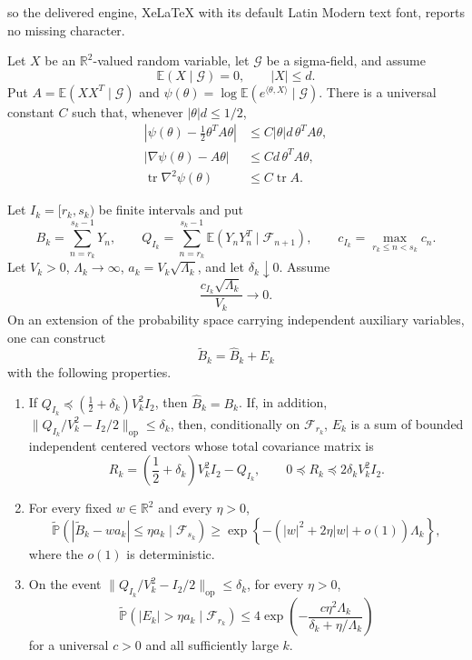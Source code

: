 \documentclass[10pt,a4paper]{amsart}
\DeclareMathOperator{\tr}{tr}
\newcommand{\E}{\mathbb E}
\begin{document}
so the delivered engine, XeLaTeX with its default Latin Modern text font, reports no missing character.
\begin{lemma}
\label{lem:conditional-tilt-estimates}
Let $X$ be an $\mathbb R^2$-valued random variable, let $\mathcal G$ be a
sigma-field, and assume
\[
 \E(X\mid\mathcal G)=0,\qquad |X|\le d.
\]
Put $A=\E(XX^T\mid\mathcal G)$ and
$\psi(\theta)=\log\E(e^{\langle\theta,X\rangle}\mid\mathcal G)$. There is a
universal constant $C$ such that, whenever $|\theta|d\le1/2$,
\begin{align*}
 \left|\psi(\theta)-\frac12\theta^TA\theta\right|
 &\le C|\theta|d\,\theta^TA\theta,\\
 \left|\nabla\psi(\theta)-A\theta\right|
 &\le Cd\,\theta^TA\theta,\\
 \tr\nabla^2\psi(\theta)&\le C\tr A.
\end{align*}
\end{lemma}

\begin{lemma}
\label{lem:completed-block}
Let $I_k=[r_k,s_k)$ be finite intervals and put
\[
 B_k=\sum_{n=r_k}^{s_k-1}Y_n,
 \qquad
 Q_{I_k}=\sum_{n=r_k}^{s_k-1}
 \E(Y_nY_n^T\mid\mathcal F_{n+1}),
 \qquad
 c_{I_k}=\max_{r_k\le n<s_k}c_n.
\]
Let $V_k>0$, $\Lambda_k\to\infty$, $a_k=V_k\sqrt{\Lambda_k}$, and let
$\delta_k\downarrow0$. Assume
\begin{equation}\label{eq:completed-block-small-increments}
 \frac{c_{I_k}\sqrt{\Lambda_k}}{V_k}\longrightarrow0.
\end{equation}
On an extension of the probability space carrying independent auxiliary
variables, one can construct
\[
 \widetilde B_k=\widehat B_k+E_k
\]
with the following properties.
\begin{enumerate}
 \item If
 $Q_{I_k}\preceq(\frac12+\delta_k)V_k^2I_2$, then
 $\widehat B_k=B_k$. If, in addition,
 $\|Q_{I_k}/V_k^2-I_2/2\|_{\mathrm{op}}\le\delta_k$, then, conditionally on
 $\mathcal F_{r_k}$, $E_k$ is a sum of bounded independent centered vectors
 whose total covariance matrix is
 \[
 R_k=\left(\frac12+\delta_k\right)V_k^2I_2-Q_{I_k},
 \qquad 0\preceq R_k\preceq2\delta_kV_k^2I_2.
 \]
 \item For every fixed $w\in\mathbb R^2$ and every $\eta>0$,
 \begin{equation}\label{eq:completed-block-lower}
 \widetilde{\mathbb P}\left(
 |\widetilde B_k-wa_k|\le\eta a_k\mid\mathcal F_{s_k}
 \right)
 \ge
 \exp\left\{-(|w|^2+2\eta|w|+o(1))\Lambda_k\right\},
 \end{equation}
 where the $o(1)$ is deterministic.
 \item On the event
 $\|Q_{I_k}/V_k^2-I_2/2\|_{\mathrm{op}}\le\delta_k$, for every $\eta>0$,
 \begin{equation}\label{eq:completion-tail}
 \widetilde{\mathbb P}\left(
 |E_k|>\eta a_k\mid\mathcal F_{r_k}
 \right)
 \le4\exp\left(
 -\frac{c\eta^2\Lambda_k}{\delta_k+\eta/\Lambda_k}
 \right)
 \end{equation}
 for a universal $c>0$ and all sufficiently large $k$.
\end{enumerate}
\end{lemma}
\end{document}
